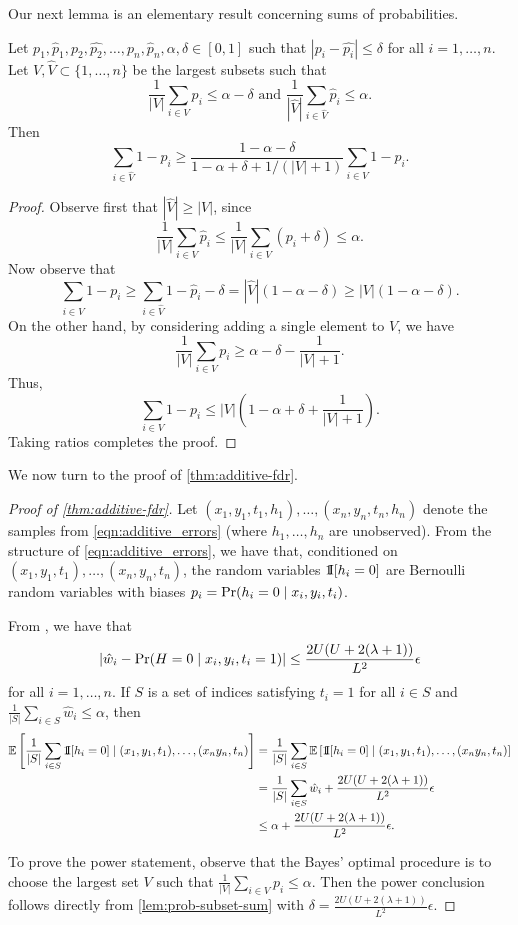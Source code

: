Our next lemma is an elementary result concerning sums of probabilities.
\begin{lemma}
\label{lem:prob-subset-sum}
Let $p_1, \hat{p}_1, p_2, \hat{p_2}, \ldots, p_n, \hat{p}_n, \alpha, \delta \in [0,1]$ such that $\left|p_i - \hat{p_i}\right| \leq \delta$ for all $i=1,\ldots, n$. Let $V, \hat{V} \subset \{1,\ldots, n\}$ be the largest subsets such that 
\[ \frac{1}{|V|} \sum_{i\in V} p_i \leq \alpha - \delta \text{ and }  \frac{1}{|\hat{V}|} \sum_{i\in \hat{V}} \hat{p}_i \leq \alpha .  \]
Then 
\[\sum_{i\in \hat{V}} 1 - {p}_i \geq \frac{1 - \alpha - \delta}{1 - \alpha + \delta + 1/(|V|+1)}\sum_{i\in {V}} 1 - {p}_i.\]
\end{lemma}
\begin{proof}
Observe first that $|\hat{V}| \geq |V|$, since 
\[ \frac{1}{|{V}|} \sum_{i\in {V}} \hat{p}_i \leq \frac{1}{|{V}|} \sum_{i\in {V}} ({p}_i + \delta) \leq \alpha. \]
Now observe that
\[ \sum_{i\in \hat{V}} 1 - {p}_i \geq \sum_{i\in \hat{V}} 1 - \hat{p}_i - \delta = |\hat{V}|(1 - \alpha - \delta) \geq |{V}|(1 - \alpha - \delta). \]
On the other hand, by considering adding a single element to $V$, we have
\[  \frac{1}{|V|} \sum_{i \in V} p_i \geq \alpha - \delta - \frac{1}{|V|+1}.  \]
Thus,
\[ \sum_{i\in {V}} 1 - {p}_i \leq |V|\left( 1 - \alpha + \delta + \frac{1}{|V|+1} \right). \]
Taking ratios completes the proof.
\end{proof}


We now turn to the proof of \cref{thm:additive-fdr}.

\begin{proof}[Proof of \cref{thm:additive-fdr}]
Let $(x_1, y_1, t_1, h_1), \ldots, (x_n, y_n, t_n, h_n)$ denote the samples from \cref{eqn:additive_errors} (where $h_1,\ldots, h_n$ are unobserved). From the structure of \cref{eqn:additive_errors}, we have that, conditioned on $(x_1, y_1, t_1), \ldots, (x_n, y_n, t_n)$, the random variables $\operatorname*{1{\hskip -2.5 pt}\hbox{I}}[h_i = 0]$ are Bernoulli random variables with biases $p_i = \textnormal{Pr}(h_i = 0 \mid x_i, y_i, t_i)$.

From , we have that
\[ \left| \hat{w}_i - \textnormal{Pr}(H=0 \mid x_i, y_i, t_i=1)\right| \leq \frac{2U(U+2(\lambda + 1))}{L^2} \epsilon \]
for all $i=1,\ldots, n$. If $S$ is a set of indices satisfying $t_i=1$ for all $i \in S$ and $\frac{1}{|S|} \sum_{i\in S} \hat{w}_i \leq \alpha$, then
\begin{align*}
\mathbb{E} \left[ \frac{1}{|S|} \sum_{i \in S} \operatorname*{1{\hskip -2.5 pt}\hbox{I}}[h_i = 0] \mid (x_1, y_1, t_1), \ldots, (x_n y_n, t_n) \right] 
&= \frac{1}{|S|} \sum_{i \in S} \mathbb{E}\left[ \operatorname*{1{\hskip -2.5 pt}\hbox{I}}[h_i = 0] \mid (x_1, y_1, t_1), \ldots, (x_n y_n, t_n) \right] \\
&=  \frac{1}{|S|} \sum_{i \in 
S} \hat{w}_i +\frac{2U(U+2(\lambda + 1))}{L^2} \epsilon \\
&\leq \alpha + \frac{2U(U+2(\lambda + 1))}{L^2} \epsilon. 
\end{align*}

To prove the power statement, observe that the Bayes' optimal procedure is to choose the largest set $V$ such that $ \frac{1}{|V|}\sum_{i \in V} p_i \leq \alpha$. Then the power conclusion follows directly from \cref{lem:prob-subset-sum} with $\delta = \frac{2U(U+2(\lambda + 1))}{L^2} \epsilon$.
\end{proof}